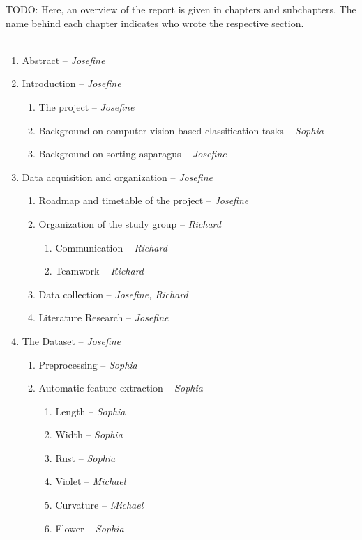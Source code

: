 TODO: Here, an overview of the report is given in chapters and subchapters. The name behind each chapter indicates who wrote the respective section.
\\
\\
\begin{enumerate}
\item Abstract -- \textit{Josefine}
\item Introduction -- \textit{Josefine}
	\begin{enumerate}
	\item The project -- \textit{Josefine}
	\item Background on computer vision based classification tasks -- \textit{Sophia}
	\item Background on sorting asparagus -- \textit{Josefine}
	\end{enumerate}
\item Data acquisition and organization -- \textit{Josefine}
	\begin{enumerate}
	\item Roadmap and timetable of the project -- \textit{Josefine}
	\item Organization of the study group -- \textit{Richard}
		\begin{enumerate}
		\item Communication -- \textit{Richard}
		\item Teamwork -- \textit{Richard}
		\end{enumerate}
	\item Data collection -- \textit{Josefine, Richard}
	\item Literature Research -- \textit{Josefine}
	\end{enumerate}
\item The Dataset -- \textit{Josefine}
	\begin{enumerate}
	\item Preprocessing -- \textit{Sophia}
	\item Automatic feature extraction -- \textit{Sophia}
		\begin{enumerate}
		\item Length -- \textit{Sophia}
		\item Width -- \textit{Sophia}
		\item Rust -- \textit{Sophia}
		\item Violet -- \textit{Michael}
		\item Curvature -- \textit{Michael}
		\item Flower -- \textit{Sophia}
		\end{enumerate}

\end{enumerate}
\end{enumerate}

